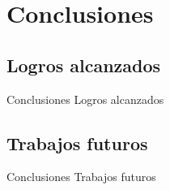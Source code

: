 \section{Conclusiones}

\subsection*{Logros alcanzados}

\begin{frame}
{Conclusiones}
{Logros alcanzados}

\end{frame}

\subsection*{Trabajos futuros}

\begin{frame}
{Conclusiones}
{Trabajos futuros}

\end{frame}